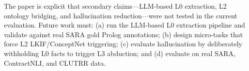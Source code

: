 \documentclass[11pt,letterpaper]{article}
\begin{document}
The paper is explicit that secondary claims---LLM-based L0 extraction, L2 ontology bridging, and hallucination reduction---were not tested in the current evaluation. Future work must: (a) run the LLM-based L0 extraction pipeline and validate against real SARA gold Prolog annotations; (b) design micro-tasks that force L2 LKIF/ConceptNet triggering; (c) evaluate hallucination by deliberately withholding L0 facts to trigger L3 abduction; and (d) evaluate on real SARA, ContractNLI, and CLUTRR data.



\end{document}
